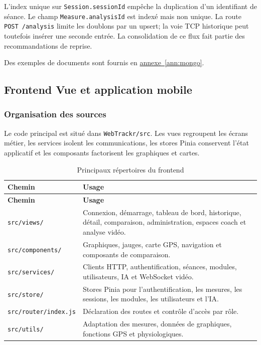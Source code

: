 \documentclass[11pt,a4paper]{article}
\newcommand{\code}[1]{\nolinkurl{#1}}
\newcommand{\annref}[1]{\hyperref[#1]{annexe~\ref*{#1}}}
\begin{document}
L'index unique sur \code{Session.sessionId} empêche la duplication d'un identifiant de séance. Le champ \code{Measure.analysisId} est indexé mais non unique. La route \code{POST /analysis} limite les doublons par un upsert; la voie TCP historique peut toutefois insérer une seconde entrée. La consolidation de ce flux fait partie des recommandations de reprise.

Des exemples de documents sont fournis en \annref{ann:mongo}.

\clearpage

\subsection{Frontend Vue et application mobile}

\subsubsection{Organisation des sources}

Le code principal est situé dans \code{WebTrackr/src}. Les vues regroupent les écrans métier, les services isolent les communications, les stores Pinia conservent l'état applicatif et les composants factorisent les graphiques et cartes.

\begin{longtable}{L{5.0cm}L{11.0cm}}
\caption{Principaux répertoires du frontend}\label{tab:frontend-files}\\
\toprule
\textbf{Chemin} & \textbf{Usage} \\
\midrule
\endfirsthead
\toprule
\textbf{Chemin} & \textbf{Usage} \\
\midrule
\endhead
\code{src/views/} & Connexion, démarrage, tableau de bord, historique, détail, comparaison, administration, espaces coach et analyse vidéo. \\
\code{src/components/} & Graphiques, jauges, carte GPS, navigation et composants de comparaison. \\
\code{src/services/} & Clients HTTP, authentification, séances, modules, utilisateurs, IA et WebSocket vidéo. \\
\code{src/store/} & Stores Pinia pour l'authentification, les mesures, les sessions, les modules, les utilisateurs et l'IA. \\
\code{src/router/index.js} & Déclaration des routes et contrôle d'accès par rôle. \\
\code{src/utils/} & Adaptation des mesures, données de graphiques, fonctions GPS et physiologiques. \\
\bottomrule
\end{longtable}
\end{document}
